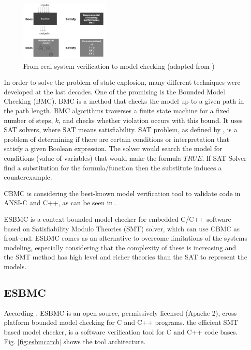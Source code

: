 \documentclass[journal]{IEEEtran}
\begin{document}
\begin{figure}[h]
\includegraphics[width=0.4\textwidth]{systemverif}
\centering
\caption{From real system verification to model checking (adapted from \cite{Clarke2008})}
\label{fig:systemverif}
\end{figure}

In order to solve the problem of state explosion, many different techniques were developed at the last decades. One of the promising is the Bounded Model Checking (BMC). BMC is a method that checks the model up to a given path in the path length. BMC algorithms traverses a finite state machine for a fixed number of steps, $ k $, and checks whether violation occurs with this bound. It uses SAT solvers, where SAT means satisfiability. SAT problem, as defined by \cite{Clarke2008}, is a problem of determining if there are certain conditions or interpretation that satisfy a given Boolean expression. %
The solver would search the model for conditions (value of variables) that would make the formula $TRUE$. If SAT Solver find a substitution for the formula/function then the substitute induces a counterexample.  

CBMC is considering the best-known model verification tool to validate code in ANSI-C and C++, as can be seen in \cite{Kroening}. 

ESBMC is a context-bounded model checker for embedded C/C++ software based on Satisfiability Modulo Theories (SMT) solver, which can use CBMC as front-end.
ESBMC comes as an alternative to overcome limitations of the systems modeling, especially considering that the complexity of these is increasing and the SMT method has high level and richer theories than the SAT to represent the models. 

\subsection{ESBMC }
According \cite{GadelhaSBMF}, ESBMC is an open source, permissively licensed (Apache 2), cross platform bounded model checking for C and C++ programs. the efficient SMT based model checker, is a software verification tool for C and C++ code bases. Fig. \ref{fig:esbmcarch} shows the tool architecture. 
\end{document}
